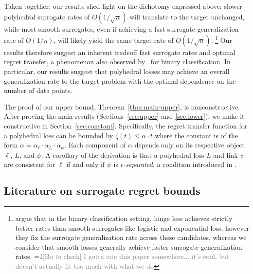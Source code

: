 \documentclass{article}
\theoremstyle{definition}\newtheorem{definition}{Definition}
\theoremstyle{definition}\newtheorem{assumption}{Assumption}
\newcommand{\Comments}{1}
\newcommand{\mynote}[2]{\ifnum\Comments=1\textcolor{#1}{#2}\fi}
\newcommand{\bo}[1]{\mynote{blue}{[Bo: #1]}}
\newcommand{\bocheck}[1]{\mynote{gray}{[Bo to check] #1}}
\begin{document}
Taken together, our results shed light on the dichotomy expressed above: slower polyhedral surrogate rates of $O(1/\sqrt{n})$ will translate to the target unchanged, while most smooth surrogates, even if achieving a fast surrogate generalization rate of $O(1/n)$, will likely yield the same target rate of $O(1/\sqrt{n})$.%
\footnote{\citet{zhang2021rates} argue that in the binary classification setting, hinge loss achieves strictly better rates than smooth surrogates like logistic and exponential loss, however they fix the surrogate generalization rate across these candidates, whereas we consider that smooth losses generally achieve faster surrogate generalization rates.
  \bocheck{I gotta cite this paper somewhere... it's cool, but doesn't actually fit too much with what we do}}
Our results therefore suggest an inherent tradeoff fast surrogate rates and optimal regret transfer, a phenomenon also observed by~\citet{mahdavi2014binary} for binary classification.
In particular, our results suggest that polyhedral losses may achieve an overall generalization rate to the target problem with the optimal dependence on the number of data points.


The proof of our upper bound, Theorem~\ref{thm:main-upper}, is nonconstructive.
After proving the main results (Sections~\ref{sec:upper} and~\ref{sec:lower}), we make it constructive in Section~\ref{sec:constant}.
Specifically, the regret transfer function for a polyhedral loss can be bounded by $\zeta(t) \leq \alpha \cdot t$ where the constant is of the form $\alpha = \alpha_{\ell} \cdot \alpha_L \cdot \alpha_{\psi}$.
Each component of $\alpha$ depends only on its respective object $\ell$, $L$, and $\psi$.
A corollary of the derivation is that a polyhedral loss $L$ and link $\psi$ are consistent for $\ell$ if and only if %
$\psi$ is \emph{$\epsilon$-separated}, a condition introduced in \citet{finocchiaro2019embedding}.

\subsection{Literature on surrogate regret bounds}
\label{sec:related-work}
\end{document}

